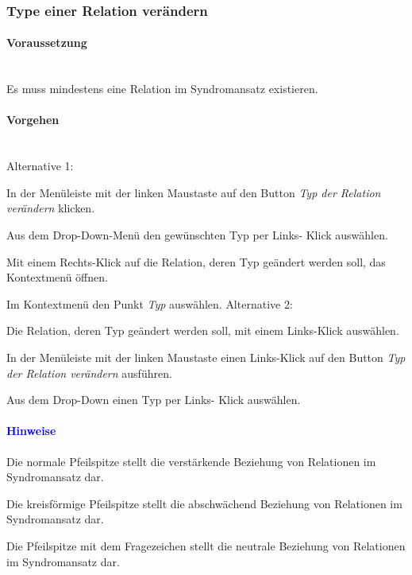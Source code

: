 \documentclass[enabledeprecatedfontcommands,fontsize=11pt,paper=a4,twoside]{scrartcl}
\newcounter{one}
\newcounter{two}[one]
\newcommand*{\hint}{\paragraph{\textcolor{blue}{Hinweise}}}
\newcommand*{\condition}{\paragraph{Voraussetzung}$\;$ \vspace{0.2cm}\\}
\newcommand*{\actions}{\paragraph{Vorgehen} $\;$\vspace{0.2cm}\\}
\newcommand*{\aOne}{\textcolor{bbe}{Alternative 1:}}
\newcommand*{\aTwo}{\textcolor{bbe}{Alternative 2:}}
\let\tempone\itemize
\let\temptwo\enditemize
\renewenvironment{itemize}{\tempone\addtolength{\itemsep}{-10.0pt}}{\temptwo}
\let\origenumerate\enumerate
\let\origendenumerate\endenumerate
\renewenvironment{enumerate}{\origenumerate \addtolength{\itemsep}{-10.0pt}}{\origendenumerate}
\begin{document}
\subsubsection{Type einer Relation verändern}
		\condition
		Es muss mindestens eine Relation im Syndromansatz existieren.
		\actions
		\aOne
		\begin{enumerate}
			\item In der Menüleiste mit der linken Maustaste auf den Button \textit{Typ der Relation verändern} klicken.
			\item Aus dem Drop-Down-Menü den gewünschten Typ per Links- Klick auswählen.
			\item Mit einem Rechts-Klick auf die Relation, deren Typ geändert werden soll, das Kontextmenü öffnen.
			\item Im Kontextmenü den Punkt \textit{Typ} auswählen.
		\end{enumerate}
		\aTwo
		\begin{enumerate}
			\item Die Relation, deren Typ geändert werden soll, mit einem Links-Klick auswählen.
			\item In der Menüleiste mit der linken Maustaste einen Links-Klick auf den Button \textit{Typ der Relation verändern} ausführen.
			\item Aus dem Drop-Down einen Typ per Links- Klick auswählen. 
		\end{enumerate}	
		\hint
		\begin{itemize}
			\item Die normale Pfeilspitze stellt die verstärkende Beziehung von Relationen im Syndromansatz dar.
			\item Die kreisförmige Pfeilspitze stellt die abschwächend Beziehung von Relationen im Syndromansatz dar.
			\item Die Pfeilspitze mit dem Fragezeichen stellt die neutrale Beziehung von Relationen im Syndromansatz dar.
		\end{itemize}
		
\end{document}
